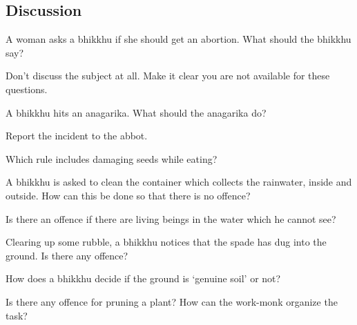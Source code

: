 \begin{exam}{\autoExamName}
\section*{Discussion}

A woman asks a bhikkhu if she should get an abortion. What should the bhikkhu say?

\begin{solution}
  Don't discuss the subject at all. Make it clear you are not available for these questions.
\end{solution}

\bigskip

A bhikkhu hits an anagarika. What should the anagarika do?

\begin{solution}
  Report the incident to the abbot.
\end{solution}

\bigskip

Which rule includes damaging seeds while eating?

\bigskip

A bhikkhu is asked to clean the container which collects the rainwater, inside and outside.
How can this be done so that there is no offence?

\bigskip

Is there an offence if there are living beings in the water which he cannot see?

\bigskip

Clearing up some rubble, a bhikkhu notices that the spade has dug into the ground. Is there any offence?

\bigskip

How does a bhikkhu decide if the ground is `genuine soil' or not?

\bigskip

Is there any offence for pruning a plant? How can the work-monk organize the task?

\end{exam}

